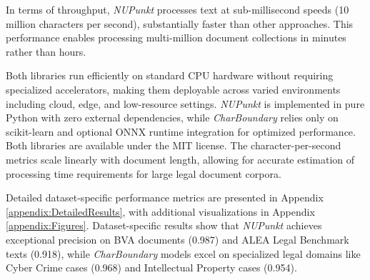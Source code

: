 In terms of throughput, \textit{NUPunkt} processes text at sub-millisecond speeds (10 million characters per second), substantially faster than other approaches. This performance enables processing multi-million document collections in minutes rather than hours.

Both libraries run efficiently on standard CPU hardware without requiring specialized accelerators, making them deployable across varied environments including cloud, edge, and low-resource settings. \textit{NUPunkt} is implemented in pure Python with zero external dependencies, while \textit{CharBoundary} relies only on scikit-learn and optional ONNX runtime integration for optimized performance. Both libraries are available under the MIT license. The character-per-second metrics scale linearly with document length, allowing for accurate estimation of processing time requirements for large legal document corpora.

Detailed dataset-specific performance metrics are presented in Appendix \ref{appendix:DetailedResults}, with additional visualizations in Appendix \ref{appendix:Figures}. Dataset-specific results show that \textit{NUPunkt} achieves exceptional precision on BVA documents (0.987) and ALEA Legal Benchmark texts (0.918), while \textit{CharBoundary} models excel on specialized legal domains like Cyber Crime cases (0.968) and Intellectual Property cases (0.954).